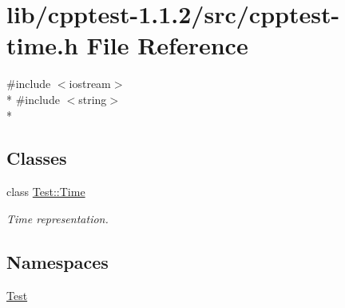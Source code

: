 \hypertarget{cpptest-time_8h}{}\section{lib/cpptest-\/1.1.2/src/cpptest-\/time.h File Reference}
\label{cpptest-time_8h}
{\ttfamily \#include $<$iostream$>$}\\*
{\ttfamily \#include $<$string$>$}\\*
\subsection*{Classes}
\begin{DoxyCompactItemize}
\item 
class \hyperlink{class_test_1_1_time}{Test\+::\+Time}
\begin{DoxyCompactList}\small\item\em Time representation. \end{DoxyCompactList}\end{DoxyCompactItemize}
\subsection*{Namespaces}
\begin{DoxyCompactItemize}
\item 
 \hyperlink{namespace_test}{Test}
\end{DoxyCompactItemize}

